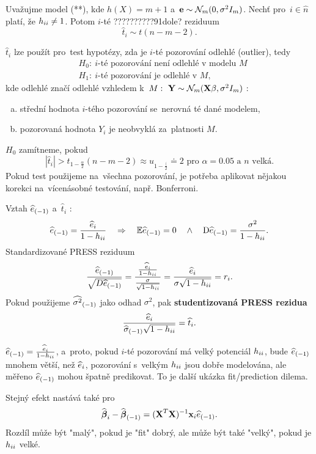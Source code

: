 \begin{corollary}
	Uvažujme model (**), kde $h(X) = m+1$ a~$\textbf{e}\sim\mathcal{N}_m(0,\sigma^2 I_m)$. Nechť pro~$i\in\widehat{n}$ platí, že $h_{ii}\neq1$. Potom $i$-té ??????????91dole? reziduum
	 $$ \widehat{t}_i\sim t(n-m-2). $$
\end{corollary}
\begin{remark}
	 $\widehat{t}_i$ lze použít pro~test hypotézy, zda je $i$-té pozorování odlehlé (outlier), tedy
	\[
	\begin{split}
	&H_0:~i\text{-té pozorování není odlehlé v~modelu }M\\
	&H_1:~i\text{-té pozorování je odlehlé v~}M,
	\end{split}
	\] kde odlehlé značí odlehlé vzhledem k~$M:~\textbf{Y}\sim\mathcal{N}_m(\textbf{X}\beta,\sigma^2 I_m)$ :\begin{enumerate}[a)]
		\item střední hodnota $i$-tého pozorování se~nerovná té dané modelem,
		\item pozorovaná hodnota $Y_i$ je neobvyklá za~platnosti $M$.
	\end{enumerate}
 $H_0$ zamítneme, pokud $$ |\widehat{t}_i|>t_{1-\frac{\alpha}{2}}(n-m-2)\approx u_{1-\frac{\lparen}{2}}\doteq 2\text{ pro~}\alpha = 0.05\text{ a~}n\text{ velká}. $$
Pokud test použijeme na~všechna pozorování, je potřeba aplikovat nějakou korekci na~vícenásobné testování, např. Bonferroni.
\end{remark}
\begin{remark}
	Vztah ${\widehat{e}_{(-1)}}$ a~$\widehat{t}_i$ :
	 $$ {\widehat{e}_{(-1)}} = \frac{\widehat{e}_i}{1-h_{ii}}\quad\Rightarrow\quad\mathbb{E}{\widehat{e}_{(-1)}} = 0\quad\wedge\quad \mathrm{D} {\widehat{e}_{(-1)}} = \frac{\sigma^2}{1-h_{ii}}. $$
	Standardizované PRESS reziduum $$ \frac{{\widehat{e}_{(-1)}}}{\sqrt{D{\widehat{e}_{(-1)}}}} = \frac{\frac{\widehat{e}_i}{1-h_{ii}}}{\frac{\sigma}{\sqrt{1-h_{ii}}}} = \frac{\widehat{e}_i}{\sigma\sqrt{1-h_{ii}}} = r_i. $$
	Pokud použijeme ${\widehat{{\sigma}^2}_{(-1)}}$ jako odhad $\sigma^2$, pak \textbf{studentizovaná PRESS rezidua} $$ \frac{\widehat{e}_i}{{\widehat{{\sigma}}_{(-1)}}\sqrt{1-h_{ii}}} = \widehat{t}_i. $$
\end{remark}
\begin{remark}
	 ${\widehat{e}_{(-1)}} = \frac{\widehat{e}_i}{1-h_{ii}}$, a~proto, pokud $i$-té pozorování má velký potenciál $h_{ii}$, bude ${\widehat{e}_{(-1)}}$ mnohem větší, než $\widehat{e}_i$, pozorování s~velkým $h_{ii}$ jsou dobře modelována, ale měřeno ${\widehat{e}_{(-1)}}$ mohou špatně predikovat. To je další ukázka fit/prediction dilema.
	
	Stejný efekt nastává také pro~
	 $$ \widehat{\boldsymbol{\beta}}_i-{\widehat{\boldsymbol{\beta}}_{(-1)}} = {(\textbf{X}^T\textbf{X})^{-1}}\textbf{x}_i{\widehat{e}_{(-1)}}. $$
	Rozdíl může být "malý", pokud je "fit" dobrý, ale může být také "velký", pokud je $h_{ii}$ velké.
\end{remark}

